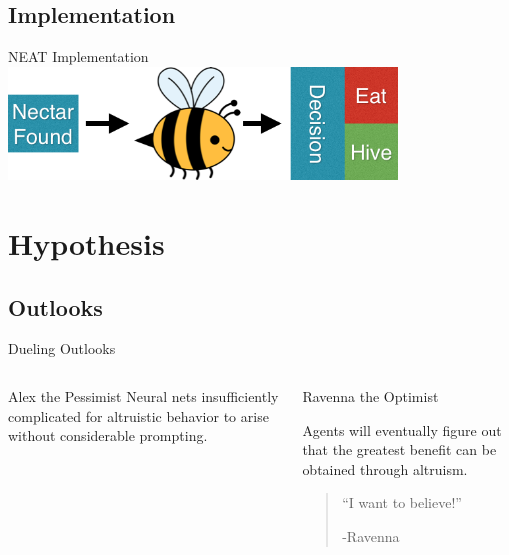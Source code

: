 \documentclass{beamer}
\begin{document}
	\subsection{Implementation}
	\begin{frame}{NEAT Implementation}
		\includegraphics[height=3cm]{bee.png}
	\end{frame}

	\section{Hypothesis}
	\subsection{Outlooks}
	\begin{frame}{Dueling Outlooks}
		\begin{columns}[t]

				\begin{block}{Alex the Pessimist}
						Neural nets insufficiently complicated for altruistic behavior to arise without considerable prompting.
				\end{block}

				\begin{block}{Ravenna the Optimist}
		
						Agents will eventually figure out that the greatest benefit can be obtained through altruism.
					\begin{quote}
						``I want to believe!''
						\begin{flushright}
						 	-Ravenna
						\end{flushright} 
					\end{quote}
				\end{block}

		\end{columns}
	\end{frame}
\end{document}
